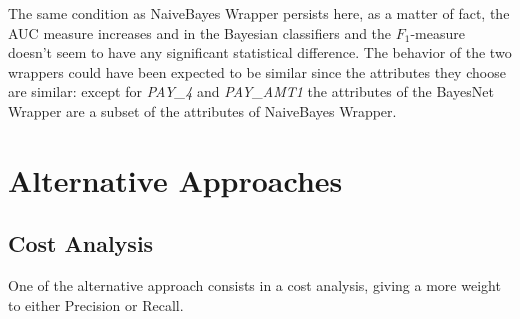 \documentclass[fleqn,10pt]{SelfArx} %
\begin{document}
\begin{table}[h!]
	\caption{Evaluation using 3 Fold Cross Validation}
	\label{table:3fcvBN}
\end{table} 

The same condition as NaiveBayes Wrapper persists here, 
as a matter of fact, the AUC measure increases and in the Bayesian classifiers and the $F_1$-measure doesn't seem to have any significant statistical difference. \newline
The behavior of the two wrappers could have been expected to be similar since the attributes they choose are similar: except for \textit{PAY\_4} and \textit{PAY\_AMT1} the attributes of the BayesNet Wrapper are a subset of the attributes of NaiveBayes Wrapper.

\section{Alternative Approaches}
\subsection{Cost Analysis}
One of the alternative approach consists in a cost analysis, giving a more weight to either Precision or Recall. 
\end{document}
